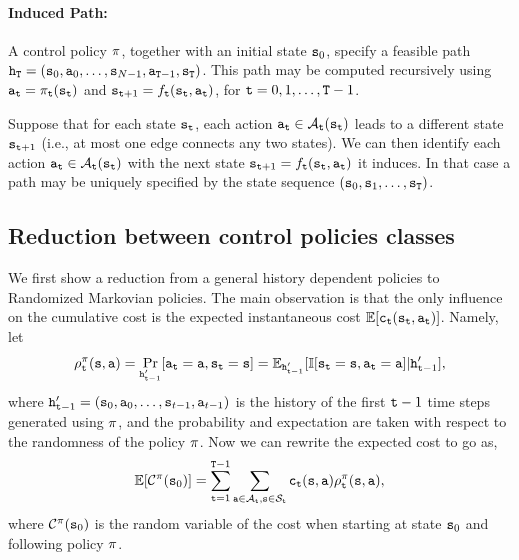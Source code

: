 \paragraph{Induced Path:}
A control policy $\pi $, together with an initial state
${{\tt s}_0}$, specify a feasible path ${{\tt h}_{\tt T}} =
({{\tt s}_0},{{\tt a}_0}, \ldots ,{{\tt s}_{N -
1}},{{\tt a}_{{\tt T} - 1}},{{\tt s}_{\tt T}})$. This path may be
computed recursively using ${{\tt a}_{{\tt t}}} = {\pi
_{{\tt t}}}({{\tt s}_{{\tt t}}})$ and ${{\tt s}_{{\tt t} + 1}} =
{f_{{\tt t}}}({{\tt s}_{{\tt t}}},{{\tt a}_{{\tt t}}})$, for ${\tt t} =
0,1, \ldots ,{\tt T} - 1$.

\begin{remark}
Suppose that for each state ${{\tt s}_{{\tt t}}}$, each action
${{\tt a}_{{\tt t}}} \in {\mathcal{A}_{{\tt t}}}({{\tt s}_{{\tt t}}})$
leads to a different state ${{\tt s}_{{\tt t} + 1}}$ (i.e., at most
one edge connects any two states). We can then identify each action
${{\tt a}_{{\tt t}}} \in {\mathcal{A}_{{\tt t}}}({\tt s}_{{\tt t}})$ with
the next state ${{\tt s}_{{\tt t} + 1}} =
{f_{{\tt t}}}({\tt s}_{{\tt t}},{{\tt a}_{{\tt t}}})$ it induces. In
that case a path may be uniquely specified by the state sequence
$({{\tt s}_0},{{\tt s}_1}, \ldots ,{{\tt s}_{\tt T}})$.
\end{remark}


\subsection{Reduction between control policies classes}

We first show a reduction from a general history dependent policies
to Randomized Markovian policies. The main observation is that the
only influence on the cumulative cost is the expected instantaneous
cost $\mathbb{E}[{\tt c}_{\tt t}({\tt s}_{\tt t},{\tt a}_{\tt t})]$. Namely, let
\[
\rho^\pi_{\tt t}({\tt s},{\tt a})=\Pr_{{\tt h}'_{{\tt t}-1}}
[{\tt a}_{\tt t}={\tt a},{\tt s}_{\tt t}={\tt s}]=\mathbb{E}_{{\tt h}'_{{\tt t}-1}}[\mathbb{I}
[{\tt s}_{\tt t}={\tt s},{\tt a}_{\tt t}={\tt a}]| {\tt h}'_{{\tt t}-1}],
\]
where
${\tt h}'_{{\tt t}-1}=({\tt s}_0,{\tt a}_0,\ldots,{\tt s}_{t-1},{\tt a}_{t-1})$
is the history of the first ${\tt t}-1$ time steps generated using
$\pi$, and the probability and expectation are taken with
respect to the randomness of the policy $\pi$. Now we can
rewrite the expected cost to go as,
\[
\mathbb{E}[\mathcal{C}^\pi({\tt s}_0)]=\sum_{{\tt t}=1}^{{\tt T}-1}
\sum_{{\tt a}\in \mathcal{A}_{\tt t},{\tt s}\in \mathcal{S}_{\tt t}}
{\tt c}_{\tt t}({\tt s},{\tt a})\rho^\pi_{\tt t}({\tt s},{\tt a}),
\]
where $\mathcal{C}^\pi({\tt s}_0)$ is the random variable of the cost
when starting at state ${\tt s}_0$ and following policy $\pi$.

